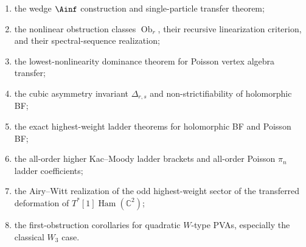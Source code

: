 \begin{enumerate}[leftmargin=2.2em]
\item the wedge $\Ainf$ construction and single-particle transfer theorem;
\item the nonlinear obstruction classes $\operatorname{Ob}_r$, their recursive linearization criterion, and their spectral-sequence realization;
\item the lowest-nonlinearity dominance theorem for Poisson vertex algebra transfer;
\item the cubic asymmetry invariant $\Delta_{r,s}$ and non-strictifiability of holomorphic BF;
\item the exact highest-weight ladder theorems for holomorphic BF and Poisson BF;
\item the all-order higher Kac--Moody ladder brackets and all-order Poisson $\pi_n$ ladder coefficients;
\item the Airy--Witt realization of the odd highest-weight sector of the transferred deformation of $T^*[1]\operatorname{Ham}(\mathbb{C}^2)$;
\item the first-obstruction corollaries for quadratic $W$-type PVAs, especially the classical $W_3$ case.
\end{enumerate}
